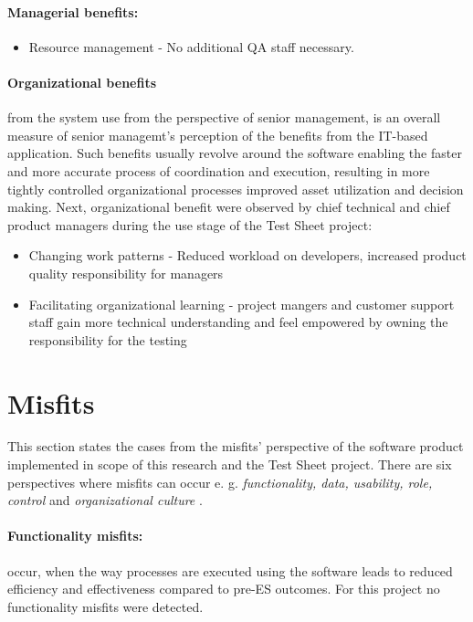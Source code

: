 \paragraph{Managerial benefits:}
\begin{itemize}
	\item Resource management - No additional QA staff necessary.
\end{itemize}


\paragraph{Organizational benefits} from the system use from the perspective of senior management, is an overall measure of senior managemt's perception of the benefits from the IT-based application. Such benefits usually revolve around the software enabling the faster and more accurate process of coordination and execution, resulting in more tightly controlled organizational processes improved asset utilization and decision making. \cite{MES11} 
Next, organizational benefit were observed by chief technical and chief product managers during the use stage of the Test Sheet project:

\begin{itemize}
	\item Changing work patterns - Reduced workload on developers, increased product quality responsibility for managers
	\item Facilitating organizational learning - project mangers and customer support staff gain more technical understanding and feel empowered by owning the responsibility for the testing
\end{itemize}



\section{Misfits}
This section states the cases from the misfits' perspective of the software product implemented in scope of this research and the Test Sheet project. There are six perspectives where misfits can occur e. g. \textit{functionality, data, usability, role, control} and \textit{organizational culture} \cite{MES10}.

\paragraph{Functionality misfits:} occur, when the way processes are executed using the software leads to reduced efficiency and effectiveness compared to pre-ES outcomes. For this project no functionality misfits were detected.

